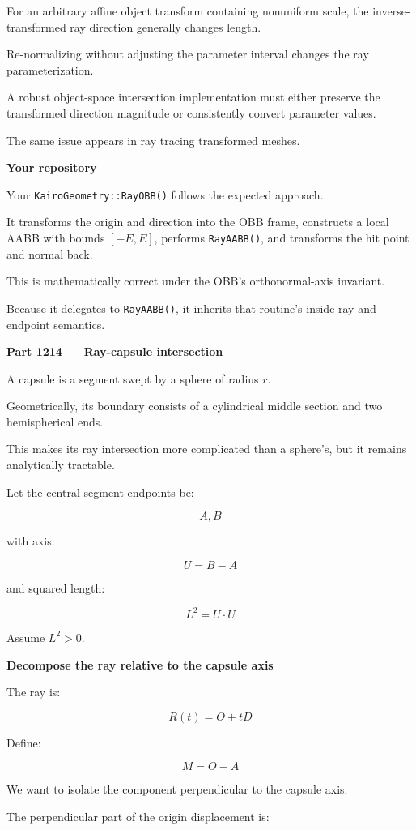 For an arbitrary affine object transform containing nonuniform scale, the inverse-transformed ray direction generally changes length.

Re-normalizing without adjusting the parameter interval changes the ray parameterization.

A robust object-space intersection implementation must either preserve the transformed direction magnitude or consistently convert parameter values.

The same issue appears in ray tracing transformed meshes.

\textbf{Your repository}

Your \texttt{KairoGeometry::RayOBB()} follows the expected approach.

It transforms the origin and direction into the OBB frame, constructs a local AABB with bounds \([-E,E]\), performs \texttt{RayAABB()}, and transforms the hit point and normal back.

This is mathematically correct under the OBB's orthonormal-axis invariant.

Because it delegates to \texttt{RayAABB()}, it inherits that routine's inside-ray and endpoint semantics.

\textbf{Part 1214 --- Ray-capsule intersection}

A capsule is a segment swept by a sphere of radius \(r\).

Geometrically, its boundary consists of a cylindrical middle section and two hemispherical ends.

This makes its ray intersection more complicated than a sphere's, but it remains analytically tractable.

Let the central segment endpoints be:

\[
A,B
\]

with axis:

\[
U=B-A
\]

and squared length:

\[
L^2=U\cdot U
\]

Assume \(L^2>0\).

\textbf{Decompose the ray relative to the capsule axis}

The ray is:

\[
R(t)=O+tD
\]

Define:

\[
M=O-A
\]

We want to isolate the component perpendicular to the capsule axis.

The perpendicular part of the origin displacement is:

